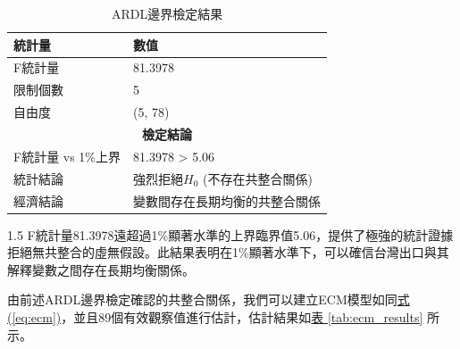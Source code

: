\documentclass[a4paper,12pt]{article}
\begin{document}
\begin{table}[h!]
  \centering
  \caption{ARDL邊界檢定結果}
  \label{tab:bounds_test}
  \begin{tabular}{ll}
    \toprule
    統計量 & 數值 \\
    \midrule
    F統計量 & 81.3978 \\
    限制個數 & 5 \\
    自由度 & (5, 78) \\
    \midrule
    \multicolumn{2}{c}{\textbf{檢定結論}} \\
    \midrule
    F統計量 vs 1\%上界 & 81.3978 > 5.06 \\
    統計結論 & 強烈拒絕$H_0$ (不存在共整合關係) \\
    經濟結論 & 變數間存在長期均衡的共整合關係 \\
    \bottomrule
  \end{tabular}
\end{table}
\begin{spacing}{1.5}
F統計量81.3978遠超過1\%顯著水準的上界臨界值5.06，提供了極強的統計證據拒絕無共整合的虛無假設。此結果表明在1\%顯著水準下，可以確信台灣出口與其解釋變數之間存在長期均衡關係。

由前述ARDL邊界檢定確認的共整合關係，我們可以建立ECM模型如同\hspace{1pt}\hyperref[eq:ecm]{式 (\ref{eq:ecm})}，並且89個有效觀察值進行估計，估計結果如\hspace{1pt}\hyperref[tab:ecm_results]{表 \ref{tab:ecm_results}} 所示。
\end{spacing}
\end{document}
